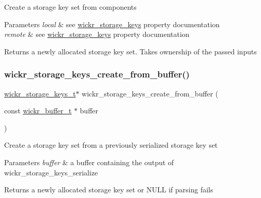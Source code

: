 Create a storage key set from components


\begin{DoxyParams}{Parameters}
{\em local} & see \textquotesingle{}\hyperlink{structwickr__storage__keys}{wickr\+\_\+storage\+\_\+keys}\textquotesingle{} property documentation \\
\hline
{\em remote} & see \textquotesingle{}\hyperlink{structwickr__storage__keys}{wickr\+\_\+storage\+\_\+keys}\textquotesingle{} property documentation \\
\hline
\end{DoxyParams}
\begin{DoxyReturn}{Returns}
a newly allocated storage key set. Takes ownership of the passed inputs 
\end{DoxyReturn}
\mbox{\label{group__wickr__storage__keys_gae5631d93182e635fb7f48269eb3f1723}} 
\subsubsection{\texorpdfstring{wickr\+\_\+storage\+\_\+keys\+\_\+create\+\_\+from\+\_\+buffer()}{wickr\_storage\_keys\_create\_from\_buffer()}}
{\footnotesize\ttfamily \hyperlink{structwickr__storage__keys}{wickr\+\_\+storage\+\_\+keys\+\_\+t}$\ast$ wickr\+\_\+storage\+\_\+keys\+\_\+create\+\_\+from\+\_\+buffer (\begin{DoxyParamCaption}\item[{const \hyperlink{structwickr__buffer}{wickr\+\_\+buffer\+\_\+t} $\ast$}]{buffer }\end{DoxyParamCaption})}

Create a storage key set from a previously serialized storage key set


\begin{DoxyParams}{Parameters}
{\em buffer} & a buffer containing the output of \textquotesingle{}wickr\+\_\+storage\+\_\+keys\+\_\+serialize\textquotesingle{} \\
\hline
\end{DoxyParams}
\begin{DoxyReturn}{Returns}
a newly allocated storage key set or N\+U\+LL if parsing fails 
\end{DoxyReturn}
\mbox{\label{group__wickr__storage__keys_ga2c1494802577d025d70bf553c43da344}} 
